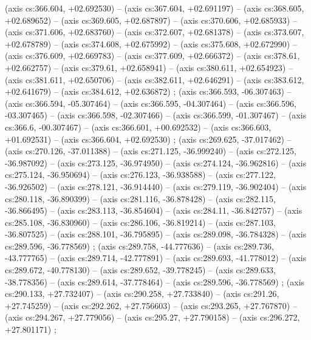     (axis cs:366.604,    +02.692530) --  (axis cs:367.604,    +02.691197) --  (axis cs:368.605,    +02.689652) --  (axis cs:369.605,    +02.687897) --  (axis cs:370.606,    +02.685933) --  (axis cs:371.606,    +02.683760) --  (axis cs:372.607,    +02.681378) --  (axis cs:373.607,    +02.678789) --  (axis cs:374.608,    +02.675992) --  (axis cs:375.608,    +02.672990) --  (axis cs:376.609,    +02.669783) --  (axis cs:377.609,    +02.666372) --  (axis cs:378.61,    +02.662757) --  (axis cs:379.61,    +02.658941) --  (axis cs:380.611,    +02.654923) --  (axis cs:381.611,    +02.650706) --  (axis cs:382.611,    +02.646291) --  (axis cs:383.612,    +02.641679) --  (axis cs:384.612,    +02.636872) ;
    (axis cs:366.593,    -06.307463) --  (axis cs:366.594,    -05.307464) --  (axis cs:366.595,    -04.307464) --  (axis cs:366.596,    -03.307465) --  (axis cs:366.598,    -02.307466) --  (axis cs:366.599,    -01.307467) --  (axis cs:366.6,    -00.307467) --  (axis cs:366.601,    +00.692532) --  (axis cs:366.603,    +01.692531) --  (axis cs:366.604,    +02.692530) ;
    (axis cs:269.625,    -37.017462) --  (axis cs:270.126,    -37.011388) --  (axis cs:271.125,    -36.999240) --  (axis cs:272.125,    -36.987092) --  (axis cs:273.125,    -36.974950) --  (axis cs:274.124,    -36.962816) --  (axis cs:275.124,    -36.950694) --  (axis cs:276.123,    -36.938588) --  (axis cs:277.122,    -36.926502) --  (axis cs:278.121,    -36.914440) --  (axis cs:279.119,    -36.902404) --  (axis cs:280.118,    -36.890399) --  (axis cs:281.116,    -36.878428) --  (axis cs:282.115,    -36.866495) --  (axis cs:283.113,    -36.854604) --  (axis cs:284.11,    -36.842757) --  (axis cs:285.108,    -36.830960) --  (axis cs:286.106,    -36.819214) --  (axis cs:287.103,    -36.807525) --  (axis cs:288.101,    -36.795895) --  (axis cs:289.098,    -36.784328) --  (axis cs:289.596,    -36.778569) ;
    (axis cs:289.758,    -44.777636) --  (axis cs:289.736,    -43.777765) --  (axis cs:289.714,    -42.777891) --  (axis cs:289.693,    -41.778012) --  (axis cs:289.672,    -40.778130) --  (axis cs:289.652,    -39.778245) --  (axis cs:289.633,    -38.778356) --  (axis cs:289.614,    -37.778464) --  (axis cs:289.596,    -36.778569) ;
    (axis cs:290.133,    +27.732407) --  (axis cs:290.258,    +27.733840) --  (axis cs:291.26,    +27.745259) --  (axis cs:292.262,    +27.756603) --  (axis cs:293.265,    +27.767870) --  (axis cs:294.267,    +27.779056) --  (axis cs:295.27,    +27.790158) --  (axis cs:296.272,    +27.801171) ;
